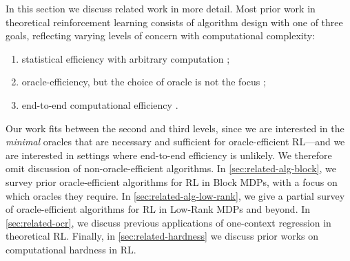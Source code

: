 In this section we discuss related work in more detail. Most prior work in theoretical reinforcement learning consists of algorithm design with one of three goals, reflecting varying levels of concern with computational complexity:
\begin{enumerate}
\item statistical efficiency with arbitrary computation \citep{jiang2017contextual,foster2021statistical};
\item oracle-efficiency, but the choice of oracle is not the focus \citep{dann2018oracle};
\item end-to-end computational efficiency \citep{kearns1998efficient,jin2020provably,golowich2024exploring}.
\end{enumerate}

Our work fits between the second and third levels, since we are interested in the \emph{minimal} oracles that are necessary and sufficient for oracle-efficient RL---and we are interested in settings where end-to-end efficiency is unlikely. We therefore omit discussion of non-oracle-efficient algorithms. In \cref{sec:related-alg-block}, we survey prior oracle-efficient algorithms for RL in Block MDPs, with a focus on which oracles they require. In \cref{sec:related-alg-low-rank}, we give a partial survey of oracle-efficient algorithms for RL in Low-Rank MDPs and beyond. In \cref{sec:related-ocr}, we discuss previous applications of one-context regression in theoretical RL. Finally, in \cref{sec:related-hardness} we discuss prior works on computational hardness in RL.

